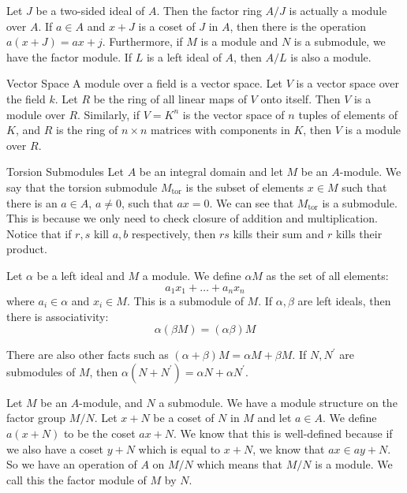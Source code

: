 \documentclass{report}
\begin{document}
Let $J$ be a two-sided ideal of $A$. Then the factor ring $A/J$ is actually a module over $A$. If $a \in A$ and $x + J$ is a coset of $J$ in $A$, then there is the operation $a(x + J) = ax + j$. Furthermore, if $M$ is a module and $N$ is a submodule, we have the factor module. If $L$ is a left ideal of $A$, then $A/L$ is also a module.

\begin{definition}{Vector Space}
    A module over a field is a vector space. Let $V$ is a vector space over the field $k$. Let $R$ be the ring of all linear maps of $V$ onto itself. Then $V$ is a module over $R$. Similarly, if $V = K^{n}$ is the vector space of $n$ tuples of elements of $K$, and $R$ is the ring of $n \times n$ matrices with components in $K$, then $V$ is a module over $R$.
\end{definition}  

\begin{definition}{Torsion Submodules}
    Let $A$ be an integral domain and let $M$ be an $A$-module. We say that the torsion submodule $M_{\text{tor}}$ is the subset of elements $x \in M$ such that there is an $a \in A$, $a \neq 0$, such that $ax = 0$. We can see that $M_{\text{tor}}$ is a submodule. This is because we only need to check closure of addition and multiplication. Notice that if $r, s$ kill $a, b$ respectively, then $rs$ kills their sum and $r$ kills their product.
\end{definition}

Let $\alpha$ be a left ideal and $M$ a module. We define $\alpha M$ as the set of all elements:
    \begin{equation*}
        a_{1}x_{1} + \ldots + a_{n} x_{n}
    \end{equation*}
where $a_{i} \in \alpha$ and $x_{i} \in M$. This is a submodule of $M$. If $\alpha, \beta$ are left ideals, then there is associativity:
    \begin{equation*}
        \alpha(\beta M) = (\alpha\beta)M
    \end{equation*}

There are also other facts such as $(\alpha + \beta)M = \alpha M + \beta M$. If $N, N^{\prime}$ are submodules of $M$, then $\alpha(N + N^{\prime}) = \alpha N + \alpha N^{\prime}$.

Let $M$ be an $A$-module, and $N$ a submodule. We have a module structure on the factor group $M/N$. Let $x + N$ be a coset of $N$ in $M$ and let $a \in A$. We define $a(x + N)$ to be the coset $ax + N$. We know that this is well-defined because if we also have a coset $y + N$ which is equal to $x + N$, we know that $ax \in ay + N$. So we have an operation of $A$ on $M/N$ which means that $M/N$ is a module. We call this the factor module of $M$ by $N$.
\end{document}
